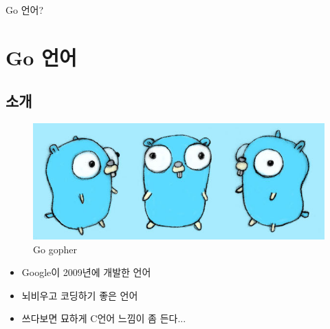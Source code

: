 \documentclass{beamer}
\begin{document}
 \begin{frame}{Go 언어?}
  \section{Go 언어}
  \subsection{소개}

    \begin{figure}
        \includegraphics[scale=5]{gopher.jpg}
        \caption{Go gopher}
    \end{figure}

  \begin{itemize}
   \item Google이 2009년에 개발한 언어
   \item 뇌비우고 코딩하기 좋은 언어
   \item 쓰다보면 묘하게 C언어 느낌이 좀 든다...
  \end{itemize}
 \end{frame}
\end{document}
